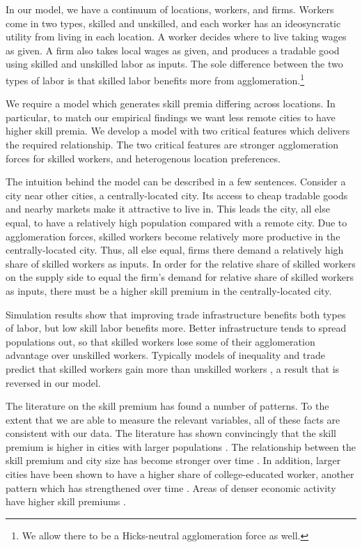 \documentclass[12 pt]{article}
\begin{document}
In our model, we have a continuum of locations, workers, and firms.  Workers come in two types, skilled and unskilled, and each worker has an ideosyncratic utility from living in each location.  A worker decides where to live taking wages as given.  A firm also takes local wages as given, and produces a tradable good using skilled and unskilled labor as inputs.  The sole difference between the two types of labor is that skilled labor benefits more from agglomeration.\footnote{We allow there to be a Hicks-neutral agglomeration force as well.}

We require a model which generates skill premia differing across locations.  In particular, to match our empirical findings we want less remote cities to have higher skill premia.  We develop a model with two critical features which delivers the required relationship.   The two critical features are stronger agglomeration forces for skilled workers, and heterogenous location preferences.

The intuition behind the model can be described in a few sentences.  Consider a city near other cities, a centrally-located city.  Its access to cheap tradable goods and nearby markets make it attractive to live in.  This leads the city, all else equal, to have a relatively high population compared with a remote city.  Due to agglomeration forces, skilled workers become relatively more productive in the centrally-located city.  Thus, all else equal, firms there demand a relatively high share of skilled workers as inputs.  In order for the relative share of skilled workers on the supply side to equal the firm's demand for relative share of skilled workers as inputs, there must be a higher skill premium in the centrally-located city.

Simulation results show that improving trade infrastructure benefits both types of labor, but low skill labor benefits more.  Better infrastructure tends to spread populations out, so that skilled workers lose some of their agglomeration advantage over unskilled workers.  Typically models of inequality and trade predict that skilled workers gain more than unskilled workers \citep{antras2006offshoring}, a result that is reversed in our model.

The literature on the skill premium has found a number of patterns.  To the extent that we are able to measure the relevant variables, all of these facts are consistent with our data.  The literature has shown convincingly that the skill premium is higher in cities with larger populations \citep{davis2012spatial}.  The relationship between the skill premium and city size has become stronger over time \citep{baum2013inequality, lindley2014spatial}.  In addition, larger cities have been shown to have a higher share of college-educated worker, another pattern which has strengthened over time \citep{moretti2008real, lindley2014spatial}.  Areas of denser economic activity have higher skill premiums \citep{combes2012sorting}.
\end{document}
